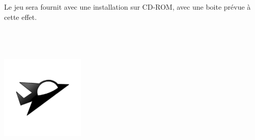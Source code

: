 \documentclass[10pt, titlepage]{report}
\begin{document}
Le jeu sera fournit avec une installation sur CD-ROM, avec une boite prévue à cette effet. \\  \\ \\ \\

\begin{center}
\includegraphics[height=4cm, width=4cm]{vaisseux_petit.png}
\end{center}
\end{document}
